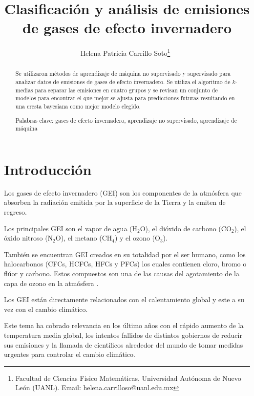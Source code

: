 \documentclass[13.6pt]{article}
\title{Clasificación y análisis de emisiones de gases de efecto invernadero}
\author{
Helena Patricia Carrillo Soto\thanks{Facultad de Ciencias Fisico Matemáticas, Universidad Autónoma de Nuevo León (UANL). Email: helena.carrilloso@uanl.edu.mx}\
}
\date{} %
\newcommand{\jhead}{Universidad Autónoma de Nuevo León}
\newcommand{\jdate}{Octubre 2023}
\begin{document}


\maketitle
\thispagestyle{firstpage}

\begin{abstract}

Se utilizaron métodos de aprendizaje de máquina no supervisado y supervisado para analizar datos de emisiones de gases de efecto invernadero. Se utiliza el algoritmo de $k$-medias para separar las emisiones en cuatro grupos y se revisan un conjunto de modelos para encontrar el que mejor se ajusta para predicciones futuras resultando en una cresta bayesiana como mejor modelo elegido.


\smallskip
\noindent
Palabras clave: gases de efecto invernadero, aprendizaje no supervisado, aprendizaje de máquina
\end{abstract}


\setlength{\baselineskip}{16pt plus.2pt}

\section{Introducción}

Los gases de efecto invernadero (GEI) son los componentes de la atmósfera que absorben la radiación emitida por la superficie de la Tierra y la emiten de regreso. 

Los principales GEI son el vapor de agua (H$_2$O), el dióxido de carbono (CO$_2$), el óxido nitroso (N$_2$O), el metano (CH$_4$) y el ozono (O$_3$). 

También se encuentran GEI creados en su totalidad por el ser humano, como los halocarbonos (CFCs, HCFCs, HFCs y PFCs) los cuales contienen cloro, bromo o flúor y carbono. Estos compuestos son una de las causas del agotamiento de la capa de ozono en la atmósfera \citep{ballesteros2007informacion} .

Los GEI están directamente relacionados con el calentamiento global y este a su vez con el cambio climático. 

Este tema ha cobrado relevancia en los último años con el rápido aumento de la temperatura media global, los intentos fallidos de distintos gobiernos de reducir sus emisiones y la llamada de científicos alrededor del mundo de tomar medidas urgentes para controlar el cambio climático.
\end{document}
